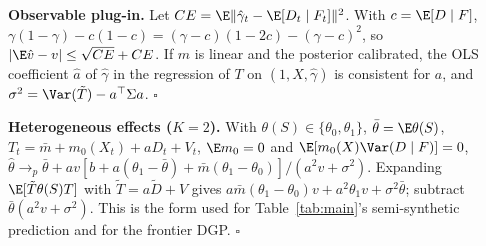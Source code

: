 \textbf{Observable plug-in.} Let $CE=\E\|\hat\gamma_t-\E[D_t\mid F_t]\|^2$. With $c=\E[D\mid F]$, $\gamma(1-\gamma)-c(1-c)=(\gamma-c)(1-2c)-(\gamma-c)^2$, so $|\E\hat v-v|\le\sqrt{CE}+CE$. If $m$ is linear and the posterior calibrated, the OLS coefficient $\hat a$ of $\hat\gamma$ in the regression of $T$ on $(1,X,\hat\gamma)$ is consistent for $a$, and $\sigma^2=\Var(\tilde T)-a^\top\Sigma a$. $\square$

\textbf{Heterogeneous effects ($K=2$).} With $\theta(S)\in\{\theta_0,\theta_1\}$, $\bar\theta=\E\theta(S)$, $T_t=\bar m+m_0(X_t)+aD_t+V_t$, $\E m_0=0$ and $\E[m_0(X)\Var(D\mid F)]=0$,
$\hat\theta\to_p\bar\theta+a v[b+a(\theta_1-\bar\theta)+\bar m(\theta_1-\theta_0)]/(a^2v+\sigma^2)$. Expanding $\E[\tilde T\theta(S)T]$ with $\tilde T=a\tilde D+V$ gives $a\bar m(\theta_1-\theta_0)v+a^2\theta_1v+\sigma^2\bar\theta$; subtract $\bar\theta(a^2v+\sigma^2)$. This is the form used for Table~\ref{tab:main}'s semi-synthetic prediction and for the frontier DGP. $\square$


